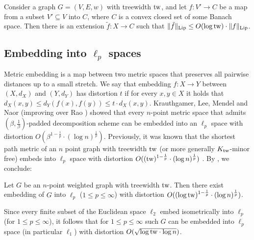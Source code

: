 \documentclass{theoretics}
\newcommand{\tw}{{\rm tw}}
\newcommand{\Lip}{{\rm Lip}}
\begin{document}
\begin{corollary}\label{thm:LipschitzExtension}
	Consider a graph $G=(V,E,w)$ with treewidth $\tw$, and let $f:V'\rightarrow C$ be a map from a subset $V'\subseteq V$ into $C$, where $C$ is a convex closed set of some Banach space.
	Then there is an extension $\tilde{f}:X\rightarrow C$ such that $\|\tilde{f}\|_{\Lip}\le O(\log\tw)\cdot \|f\|_{\Lip}$.
\end{corollary}


\subsection{Embedding into \texorpdfstring{$\ell_p$}{lp} spaces}
Metric embedding is a map between two metric spaces that preserves all pairwise distances up to a small stretch. We say that embedding $f:X\rightarrow Y$ between $(X,d_X)$ and $(Y,d_Y)$ has distortion $t$ if for every $x,y\in X$ it holds that $d_X(x,y)\le d_Y(f(x),f(y))\le t\cdot d_X(x,y)$. Krauthgamer, Lee, Mendel and Naor \cite{KLMN04} (improving over Rao \cite{Rao99}) showed that every $n$-point metric space that admits $(\beta,\frac1\beta)$-padded decomposition scheme can be embedded into an $\ell_p$ space with distortion $O(\beta^{1-\frac1p}\cdot(\log n)^{\frac1p})$.
Previously, it was known that the shortest path metric of an $n$ point graph with treewidth $\tw$ (or more generally $K_{\tw}$-minor free) embeds into $\ell_p$ space with distortion $O((\tw)^{1-\frac1p}\cdot(\log n)^{\frac1p})$ \cite{KLMN04,AGGNT19}.
By , we conclude:

\begin{corollary}\label{cor:EmbeddingLp}
	Let $G$ be an $n$-point weighted graph with treewidth $\tw$. Then there exist embedding of $G$ into $\ell_p$ ($1\le p\le\infty$) with distortion $O((\log \tw)^{1-\frac1p}\cdot(\log n)^{\frac1p})$.
\end{corollary}
Since every finite subset of the Euclidean space $\ell_2$ embed isometrically into $\ell_p$ (for $1\le p\le\infty$), it follows that for $1\le p\le\infty$ such $G$ can be embedded into $\ell_p$ space (in particular $\ell_1$) with distortion $O(\sqrt{\log \tw\cdot \log n})$.
\end{document}
